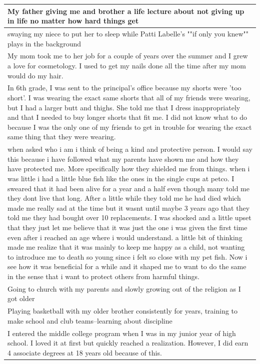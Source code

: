 \documentclass[
  .7em,
  letterpaper,
  DIV=11,
  numbers=noendperiod]{scrartcl}
\begin{document}
\begin{table}
\begin{tabular}{l}
\hline
My father giving me and brother a life lecture about not giving up in life no matter how hard things get\\
\hline
swaying my niece to put her to sleep while Patti Labelle's ""if only you knew"" plays in the background\\
\hline
My mom took me to her job for a couple of years over the summer and I grew a love for cosmetology. I used to get my nails done all the time after my mom would do my hair.\\
\hline
In 6th grade, I was sent to the principal's office because my shorts were 'too short'. I was wearing the exact same shorts that all of my friends were wearing, but I had a larger butt and thighs. She told me that I dress inappropriately and that I needed to buy longer shorts that fit me. I did not know what to do because I was the only one of my friends to get in trouble for wearing the exact same thing that they were wearing.\\
\hline
when asked who i am i think of being a kind and protective person. I would say this because i have followed what my parents have shown me and how they have protected me. More specifically how they shielded me from things. when i was little i had a little blue fish like the ones in the single cups at petco. I sweared that it had been alive for a year and a half even though many told me they dont live that long. After a little while they told me he had died which made me really sad at the time but it wasnt until maybe 3 years ago that they told me they had bought over 10 replacements. I was shocked and a little upset that they just let me believe that it was just the one i was given the first time even after i reached an age where i would understand. a little bit of thinking made me realize that it was mainly to keep me happy as a child, not wanting to introduce me to death so young since i felt so close with my pet fish. Now i see how it was beneficial for a while and it shaped me to want to do the same in the sense that i want to protect others from harmful things.\\
\hline
Going to church with my parents and slowly growing out of the religion as I got older\\
\hline
Playing basketball with my older brother consistently for years, training to make school and club teams--learning about discipline\\
\hline
I entered the middle college program when I was in my junior year of high school. I loved it at first but quickly reached a realization. However, I did earn 4 associate degrees at 18 years old because of this.\\

\end{tabular}
\end{table}
\end{document}
